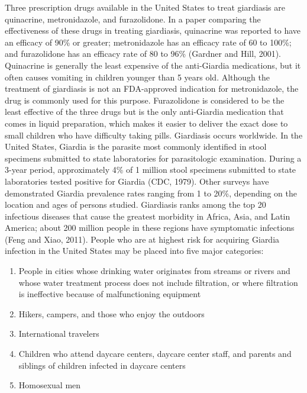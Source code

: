 \documentclass{article}
\begin{document}
Three prescription drugs available in the United States to treat
giardiasis are quinacrine, metronidazole, and furazolidone. In a paper
comparing the effectiveness of these drugs in treating giardiasis,
quinacrine was reported to have an efficacy of 90\% or greater;
metronidazole has an efficacy rate of 60 to 100\%; and furazolidone has
an efficacy rate of 80 to 96\% (Gardner and Hill, 2001). Quinacrine is
generally the least expensive of the anti-Giardia medications, but it
often causes vomiting in children younger than 5 years old. Although the
treatment of giardiasis is not an FDA-approved indication for
metronidazole, the drug is commonly used for this purpose. Furazolidone
is considered to be the least effective of the three drugs but is the
only anti-Giardia medication that comes in liquid preparation, which
makes it easier to deliver the exact dose to small children who have
difficulty taking pills. Giardiasis occurs worldwide. In the United
States, Giardia is the parasite most commonly identified in stool
specimens submitted to state laboratories for parasitologic examination.
During a 3-year period, approximately 4\% of 1 million stool specimens
submitted to state laboratories tested positive for Giardia (CDC, 1979).
Other surveys have demonstrated Giardia prevalence rates ranging from 1
to 20\%, depending on the location and ages of persons studied.
Giardiasis ranks among the top 20 infectious diseases that cause the
greatest morbidity in Africa, Asia, and Latin America; about 200 million
people in these regions have symptomatic infections (Feng and Xiao,
2011). People who are at highest risk for acquiring Giardia infection in
the United States may be placed into five major categories:

\begin{enumerate}
\def\labelenumi{\arabic{enumi}.}
\tightlist
\item
  People in cities whose drinking water originates from streams or
  rivers and whose water treatment process does not include filtration,
  or where filtration is ineffective because of malfunctioning equipment
\item
  Hikers, campers, and those who enjoy the outdoors
\item
  International travelers
\item
  Children who attend daycare centers, daycare center staff, and parents
  and siblings of children infected in daycare centers
\item
  Homosexual men
\end{enumerate}
\end{document}
